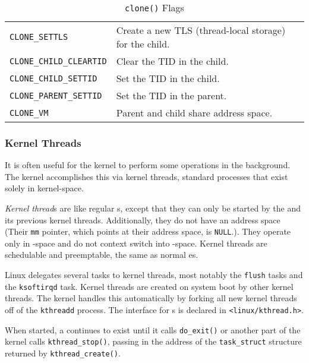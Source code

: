 \begin{table}[h!tbp]
\begin{tabular}{ll}
    \texttt{CLONE_SETTLS} & Create a new TLS (thread-local storage) for the child. \\
    \texttt{CLONE_CHILD_CLEARTID} & Clear the TID in the child. \\
    \texttt{CLONE_CHILD_SETTID} & Set the TID in the child. \\
    \texttt{CLONE_PARENT_SETTID} & Set the TID in the parent. \\
    \texttt{CLONE_VM} & Parent and child share address space. \\
    \bottomrule
  \end{tabular}
  \caption{\texttt{clone()} Flags}
  \label{tab:Clone_Flags}
\end{table}

\subsubsection{Kernel Threads}\label{subsubsec:Kernel_Threads}
It is often useful for the kernel to perform some operations in the background.
The kernel accomplishes this via kernel threads, standard processes that exist solely in kernel-space.

\begin{definition}\label{def:Kernel_Thread}
  \emph{Kernel thread}s are like regular s, except that they can only be started by the  and its previous kernel threads.
  Additionally, they do not have an address space (Their \texttt{mm} pointer, which points at their address space, is \texttt{NULL}.).
  They operate only in -space and do not context switch into -space.
  Kernel threads are schedulable and preemptable, the same as normal es.
\end{definition}

Linux delegates several tasks to kernel threads, most notably the \texttt{flush} tasks and the \texttt{ksoftirqd} task.
Kernel threads are created on system boot by other kernel threads.
The kernel handles this automatically by forking all new kernel threads off of the \texttt{kthreadd}  process.
The interface for s is declared in \texttt{<linux/kthread.h>}.

When started, a  continues to exist until it calls \texttt{do_exit()} or another part of the kernel calls \texttt{kthread_stop()}, passing in the address of the \texttt{task_struct} structure returned by \texttt{kthread_create()}.

